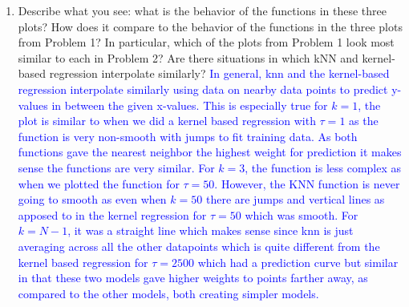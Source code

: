 \documentclass[submit]{harvardml}
\begin{document}
\begin{problem}
\begin{enumerate}
\item Describe what you see: what is the behavior of the functions in
  these three plots?  How does it compare to the behavior of the
  functions in the three plots from Problem 1? In particular, which of the plots from Problem 1 look most similar to each in Problem 2? Are there situations
  in which kNN and kernel-based regression interpolate similarly?
  \textcolor{blue}{ In general, knn and the kernel-based regression interpolate similarly using data on nearby data points to predict y-values in between the given x-values. This is especially true for $k=1$, the plot is similar to when we did a kernel based regression with $\tau = 1$ as the function is very non-smooth with jumps to fit training data. As both functions gave the nearest neighbor the highest weight for prediction it makes sense the functions are very similar. For $k=3$, the function is less complex as when we plotted the function for $\tau =50$. However, the KNN function is never going to smooth as even when $k =50$ there are jumps and vertical lines as apposed to in the kernel regression for $\tau =50$ which was smooth. For $k = N-1$, it was a straight line which makes sense since knn is just averaging across all the other datapoints which is quite different from the kernel based regression for $\tau = 2500$ which had a prediction curve but similar in that these two models gave higher weights to points farther away, as compared to the other models, both creating simpler models.  }


\end{enumerate}

\end{problem}
\end{document}
